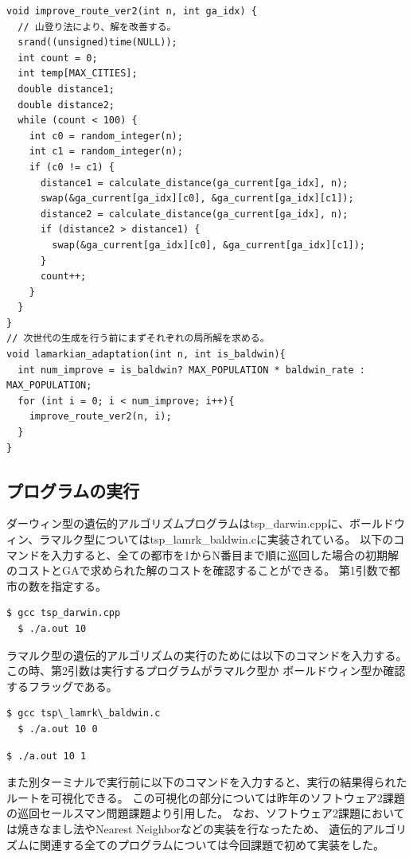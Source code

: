 \documentclass[uplatex]{jsarticle}
\begin{document}
\begin{lstlisting}[basicstyle=\ttfamily\footnotesize, frame=single]
void improve_route_ver2(int n, int ga_idx) {
  // 山登り法により、解を改善する。
  srand((unsigned)time(NULL));
  int count = 0;
  int temp[MAX_CITIES];
  double distance1;
  double distance2;
  while (count < 100) {
    int c0 = random_integer(n);
    int c1 = random_integer(n);
    if (c0 != c1) {
      distance1 = calculate_distance(ga_current[ga_idx], n);
      swap(&ga_current[ga_idx][c0], &ga_current[ga_idx][c1]);
      distance2 = calculate_distance(ga_current[ga_idx], n);
      if (distance2 > distance1) {
        swap(&ga_current[ga_idx][c0], &ga_current[ga_idx][c1]);
      }
      count++;
    }
  }
}
// 次世代の生成を行う前にまずそれぞれの局所解を求める。
void lamarkian_adaptation(int n, int is_baldwin){
  int num_improve = is_baldwin? MAX_POPULATION * baldwin_rate : MAX_POPULATION;
  for (int i = 0; i < num_improve; i++){
    improve_route_ver2(n, i);
  }
}
\end{lstlisting}


\subsection{プログラムの実行}
ダーウィン型の遺伝的アルゴリズムプログラムはtsp\_darwin.cppに、ボールドウィン、ラマルク型についてはtsp\_lamrk\_baldwin.cに実装されている。
以下のコマンドを入力すると、全ての都市を1からN番目まで順に巡回した場合の初期解のコストとGAで求められた解のコストを確認することができる。
第1引数で都市の数を指定する。

\begin{lstlisting}[basicstyle=\ttfamily\footnotesize, frame=single]
  $ gcc tsp_darwin.cpp
  $ ./a.out 10
\end{lstlisting}

ラマルク型の遺伝的アルゴリズムの実行のためには以下のコマンドを入力する。この時、第2引数は実行するプログラムがラマルク型か
ボールドウィン型か確認するフラッグである。

\begin{lstlisting}[basicstyle=\ttfamily\footnotesize, frame=single]
  $ gcc tsp\_lamrk\_baldwin.c
  $ ./a.out 10 0
\end{lstlisting}
\begin{lstlisting}[basicstyle=\ttfamily\footnotesize, frame=single]
  $ ./a.out 10 1
\end{lstlisting}
また別ターミナルで実行前に以下のコマンドを入力すると、実行の結果得られたルートを可視化できる。
この可視化の部分については昨年のソフトウェア2課題の巡回セールスマン問題課題より引用した。
なお、ソフトウェア2課題においては焼きなまし法やNearest Neighborなどの実装を行なったため、
遺伝的アルゴリズムに関連する全てのプログラムについては今回課題で初めて実装をした。
\end{document}
